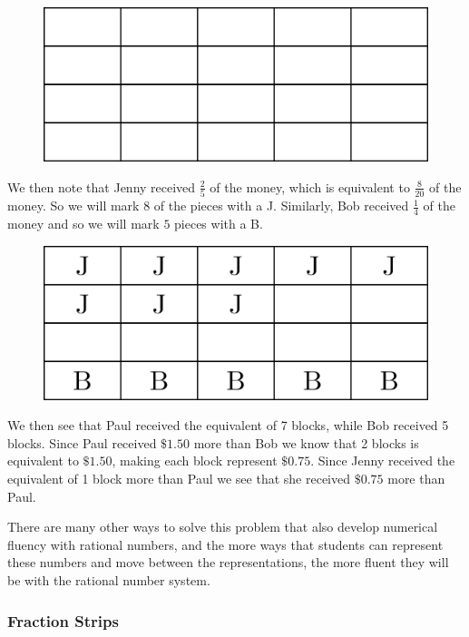 \documentclass[
]{book}
\theoremstyle{definition}
\theoremstyle{definition}
\theoremstyle{definition}
\theoremstyle{definition}
\theoremstyle{remark}
\begin{document}
\begin{figure}

{\centering \includegraphics[width=0.6\linewidth]{tikz/singapore-fraction1} 

}

\end{figure}

We then note that Jenny received \(\frac{2}{5}\) of the money, which is equivalent to \(\frac{8}{20}\) of the money. So we will mark \(8\) of the pieces with a J. Similarly, Bob received \(\frac{1}{4}\) of the money and so we will mark \(5\) pieces with a B.

\begin{figure}

{\centering \includegraphics[width=0.6\linewidth]{tikz/singapore-fraction2} 

}

\end{figure}

We then see that Paul received the equivalent of 7 blocks, while Bob received 5 blocks. Since Paul received \(\$1.50\) more than Bob we know that 2 blocks is equivalent to \(\$1.50\), making each block represent \(\$0.75\). Since Jenny received the equivalent of 1 block more than Paul we see that she received \(\$0.75\) more than Paul.

There are many other ways to solve this problem that also develop numerical fluency with rational numbers, and the more ways that students can represent these numbers and move between the representations, the more fluent they will be with the rational number system.

\hypertarget{fraction-strips}{%
\subsubsection{Fraction Strips}\label{fraction-strips}}
\end{document}

